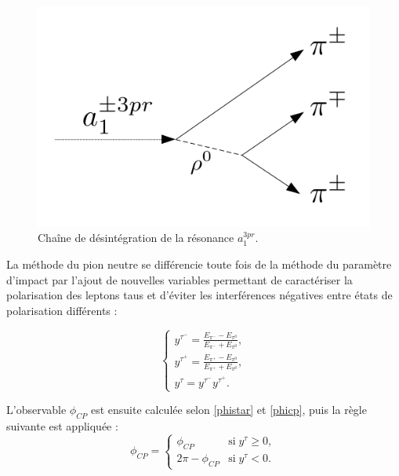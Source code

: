 \begin{figure}[!ht]
\centering
    \includegraphics[scale=0.5]{Chapitre6/Images/rhoDP.png} 
    \caption{Chaîne de désintégration de la résonance $a_1^{3pr}$.}
    \label{rho0plane}
\end{figure}

La méthode du pion neutre se différencie toute fois de la méthode du paramètre d'impact par l'ajout de nouvelles variables permettant de caractériser la polarisation des leptons taus et d'éviter les interférences négatives entre états de polarisation différents :

\begin{equation}
    \left\{
    \begin{array}{ll}
        y^{\tau^-}=\frac{E_{\pi^-}-E_{\pi^0}}{E_{\pi^-}+E_{\pi^0}}, \\
        y^{\tau^+}=\frac{E_{\pi^+}-E_{\pi^0}}{E_{\pi^+}+E_{\pi^0}}, \\
        y^{\tau}=y^{\tau^-}y^{\tau^+}.
    \end{array}
    \right.
\end{equation} 

L'observable $\phi_{CP}$ est ensuite calculée selon \ref{phistar} et \ref{phicp}, puis la règle suivante est appliquée : \\

\begin{equation}
\phi_{CP}=
    \left\{
    \begin{array}{ll}
        \phi_{CP} & \mbox{si} \; y^{\tau}\geq0, \\
        2\pi - \phi_{CP} & \mbox{si} \; y^{\tau}<0.
    \end{array}
    \right.
\end{equation}

